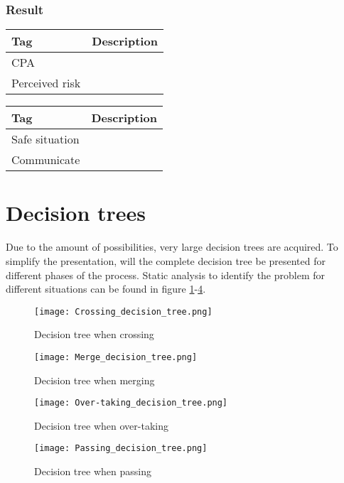 \subsubsection{Result}
\begin{table}[H]
	\begin{tabular}{p{}|p{}}
		\toprule
		Tag & Description\\
		\midrule
		CPA & \\
		Perceived risk & \\
		\bottomrule
	\end{tabular}
	
	\label{tab:criteria-safe-situation}
\end{table}

\begin{table}[H]
	\begin{tabular}{p{}|p{}}
		\toprule
		Tag & Description\\
		\midrule
		Safe situation & \\
		Communicate & \\
		\bottomrule
	\end{tabular}
	
	\label{tab:result}
\end{table}


\section{Decision trees}
Due to the amount of possibilities, very large decision trees are acquired. To simplify the presentation, will the complete decision tree be presented for different phases of the process. Static analysis to identify the problem for different situations can be found in figure \ref{fig:Crossing_decision_tree}-\ref{fig:Passing_decision_tree}.

\begin{figure}[p]
	\centering
	\texttt{[image: Crossing\_decision\_tree.png]}
	\caption{Decision tree when crossing}
	\label{fig:Crossing_decision_tree}
\end{figure}


\begin{figure}[p]
	\centering
	\texttt{[image: Merge\_decision\_tree.png]}
	\caption{Decision tree when merging}
	\label{fig:Merge_decision_tree}
\end{figure}


\begin{figure}[p]
	\centering
	\texttt{[image: Over-taking\_decision\_tree.png]}
	\caption{Decision tree when over-taking}
	\label{fig:Over-taking_decision_tree}
\end{figure}


\begin{figure}[p]
	\centering
	\texttt{[image: Passing\_decision\_tree.png]}
	\caption{Decision tree when passing}
	\label{fig:Passing_decision_tree}
\end{figure}


